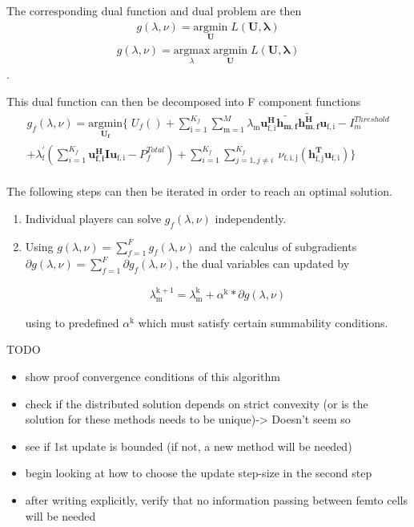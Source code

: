 \documentclass[12pt]{article}
\begin{document}
The corresponding dual function and dual problem are then 
\begin{gather*}
g(\lambda,\nu) = \underset{\mathbf{U}}{\mathrm{argmin}}\;L(\mathbf{U,\lambda})
\end{gather*}
\begin{gather*}
g(\lambda,\nu) = \underset{\lambda}{\mathrm{argmax}}\;\underset{\mathbf{U}}{\mathrm{argmin}}\;L(\mathbf{U,\lambda})
\end{gather*}
.



This dual function can then be decomposed into F component functions
\begin{multline}
g_f(\lambda,\nu) = \underset{\mathbf{U_f}}{\mathrm{argmin}}
\{
\;
U_f() 
+
\sum_{\mathrm{i=1}}^{K_f}
\sum_{\mathrm{m=1}}^M \lambda_{\mathrm{m}}
\mathbf{u_{ \mathrm{f,i}}^H} \mathbf{\tilde{h_{m,f}}} \mathbf{\tilde{h_{m,f}^H}} \mathbf{u_{\mathrm{f,i}}} - I^{Threshold}_{m}
\\
+ 
\lambda_{\mathrm{f}}^{'}(
\sum_{i=1}^{K_f}\mathbf{u_{f,i}^H} \mathbf{I} \mathbf{u_{\mathrm{f,i}}} -  P^{Total}_{f})
+
\sum_{i=1}^{K_f}
\sum_{j=1, j\neq i}^{K_f}
\
\nu_{\mathrm{f,i,j}}(\mathbf{h^T_{\mathrm{f,j}}}\mathbf{u_{\mathrm{f,i}}})\}
\end{multline}
\\



The following steps can then be iterated in order to reach an optimal solution. 
\begin{enumerate}
\item 
Individual players can solve $ g_f(\lambda,\nu) $ independently.
\item 
Using $g(\lambda,\nu) = \sum_{f=1}^{F}g_f(\lambda,\nu)$ and the calculus of subgradients $\partial g(\lambda,\nu) = \sum_{f=1}^{F} \partial g_f(\lambda,\nu)$, the dual variables can updated by 

\begin{gather}
\lambda_{\mathrm{m}}^{\mathrm{k+1}} = 
\lambda_{\mathrm{m}}^{\mathrm{k}}
+
\alpha^{\mathrm{k}}*
\partial g(\lambda,\nu)
\end{gather}

using to predefined $\alpha^{\mathrm{k}}$ which must satisfy certain summability conditions.



\end{enumerate} 

TODO 
\begin{itemize}
\item show proof convergence conditions of this algorithm
\item check if the distributed solution depends on strict convexity (or is  the solution for these methods needs to be unique)-> Doesn't seem so
\item see if 1st update is bounded (if not, a new method will be needed)
\item begin looking at how to choose the update step-size in the second step
\item after writing explicitly, verify that no information passing between femto cells will be needed 
\end{itemize}
\end{document}
